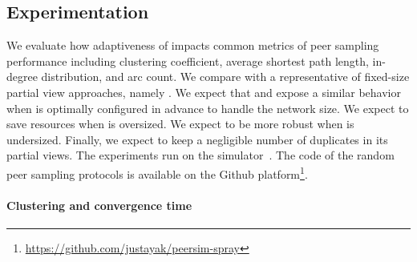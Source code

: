 \subsection{Experimentation}
\label{subsec:experiments}

We evaluate how adaptiveness of \SPRAY impacts common metrics of peer sampling
performance including clustering coefficient, average shortest path length,
in-degree distribution, and arc count. We compare \SPRAY with a representative
of fixed-size partial view approaches, namely \CYCLON. We expect that \SPRAY and
\CYCLON expose a similar behavior when \CYCLON is optimally configured in
advance to handle the network size. We expect \SPRAY to save resources when
\CYCLON is oversized. We expect \SPRAY to be more robust when \CYCLON is
undersized. Finally, we expect \SPRAY to keep a negligible number of duplicates
in its partial views. The experiments run on the \PEERSIM
simulator~\cite{montresor2009peersim}. The code of the random peer sampling
protocols is available on the Github
platform\footnote{\url{https://github.com/justayak/peersim-spray}}.









\vspace{-7pt}
\paragraph{Clustering and convergence time}

